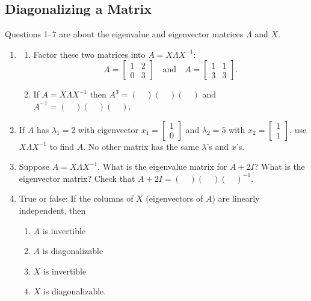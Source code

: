 \documentclass[14pt, a4paper]{article}
\begin{document}
\subsection{Diagonalizing a Matrix}
\noindent Questions 1--7 are about the eigenvalue and eigenvector matrices $\Lambda$ and $X$.

\begin{enumerate}
    \item
          \begin{enumerate}
              \item Factor these two matrices into $A = X\Lambda X^{-1}$:
                    \[
                        A = \begin{bmatrix} 1 & 2 \\ 0 & 3 \end{bmatrix} \quad \text{and} \quad A = \begin{bmatrix} 1 & 1 \\ 3 & 3 \end{bmatrix} .
                    \]
              \item If $A = X\Lambda X^{-1}$ then $A^3 = ( \quad )( \quad )( \quad )$ and $A^{-1} = ( \quad )( \quad )( \quad )$.
          \end{enumerate}

    \item If $A$ has $\lambda_1 = 2$ with eigenvector $x_1 = \begin{bmatrix} 1 \\ 0 \end{bmatrix}$ and $\lambda_2 = 5$ with $x_2 = \begin{bmatrix} 1 \\ 1 \end{bmatrix}$, use $X\Lambda X^{-1}$ to find $A$. No other matrix has the same $\lambda$'s and $x$'s.

    \item Suppose $A = X\Lambda X^{-1}$. What is the eigenvalue matrix for $A + 2I$? What is the eigenvector matrix? Check that $A + 2I = ( \quad )( \quad )( \quad )^{-1}$.

    \item True or false: If the columns of $X$ (eigenvectors of $A$) are linearly independent, then
          \begin{enumerate}
              \item $A$ is invertible
              \item $A$ is diagonalizable
              \item $X$ is invertible
              \item $X$ is diagonalizable.
          \end{enumerate}


\end{enumerate}
\end{document}
